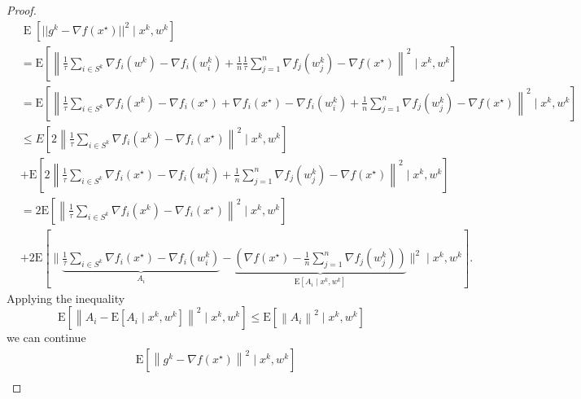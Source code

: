 \documentclass[12pt,a4paper]{article}
\DeclareMathOperator{\E}{\mathrm{E}}
\begin{document}
	\begin{proof}
		\begin{equation}
			\begin{aligned}
				&\E\left[||g^k-\nabla f(x^{\star})||^2\mid x^k,w^k\right]\\
				&=\mathrm{E}\left[\left\|\frac{1}{\tau}\sum_{i\in S^k}\nabla f_{i}\left(w^{k}\right)-\nabla f_{i}\left(w_{i}^{k}\right)+\frac{1}{n} \frac{1}{\tau}\sum_{j=1}^{n} \nabla f_{j}\left(w_{j}^{k}\right)-\nabla f\left(x^{\star}\right)\right\|^{2} \mid x^{k}, w^{k}\right]\\
				&=\mathrm{E}\left[\left\|\frac{1}{\tau}\sum_{i\in S^k}\nabla f_{i}\left(x^{k}\right)-\nabla f_{i}\left(x^{\star}\right)+\nabla f_{i}\left(x^{\star}\right)-\nabla f_{i}\left(w_{i}^{k}\right)+\frac{1}{n} \sum_{j=1}^{n} \nabla f_{j}\left(w_{j}^{k}\right)-\nabla f\left(x^{\star}\right)\right\|^{2} \mid x^{k}, w^{k}\right]\\
				&\leq E\left[2\left\|\frac{1}{\tau}\sum_{i\in S^k}\nabla f_{i}\left(x^{k}\right)-\nabla f_{i}\left(x^{\star}\right)\right\|^{2} \mid x^{k}, w^{k}\right]\\
				&+\mathrm{E}\left[2\left\|\frac{1}{\tau}\sum_{i\in S^k}\nabla f_{i}\left(x^{\star}\right)-\nabla f_{i}\left(w_{i}^{k}\right)+\frac{1}{n} \sum_{j=1}^{n} \nabla f_{j}\left(w_{j}^{k}\right)-\nabla f\left(x^{\star}\right)\right \|^{2} \mid x^{k}, w^{k}\right]\\
				&=2 \mathrm{E}\left[\left\|\frac{1}{\tau}\sum_{i\in S^k}\nabla f_{i}\left(x^{k}\right)-\nabla f_{i}\left(x^{\star}\right)\right\|^{2} \mid x^{k}, w^{k}\right]\\
				&+2 \mathrm{E}\left[\|\underbrace{\frac{1}{\tau}\sum_{i\in S^k}\nabla f_{i}\left(x^{\star}\right)-\nabla f_{i}\left(w_{i}^{k}\right)}_{A_{i}}-\underbrace{\left(\nabla f\left(x^{\star}\right)-\frac{1}{n} \sum_{j=1}^{n} \nabla f_{j}\left(w_{j}^{k}\right)\right)}_{\mathrm{E}\left[A_{i} \mid x^{k}, w^{k}\right]}\|^{2} \mid x^{k}, w^{k}\right] .
			\end{aligned}
		\end{equation}
	Applying the inequality
	$$
	\mathrm{E}\left[\left\|A_{i}-\mathrm{E}\left[A_{i} \mid x^{k}, w^{k}\right]\right\|^{2} \mid x^{k}, w^{k}\right] \leq \mathrm{E}\left[\left\|A_{i}\right\|^{2} \mid x^{k}, w^{k}\right]
	$$
	we can continue
	\begin{equation}
		\begin{aligned}
			&\mathrm{E}\left[\left\|g^{k}-\nabla f\left(x^{\star}\right)\right\|^{2} \mid x^{k}, w^{k}\right] \\

\end{aligned}
\end{equation}
\end{proof}
\end{document}
